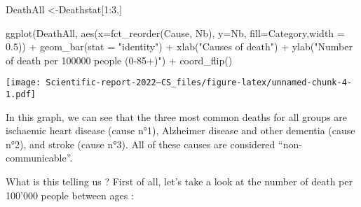 \documentclass[
]{article}
\newenvironment{Shaded}{\begin{snugshade}}{\end{snugshade}}
\newcommand{\AttributeTok}[1]{\textcolor[rgb]{0.77,0.63,0.00}{#1}}
\newcommand{\DecValTok}[1]{\textcolor[rgb]{0.00,0.00,0.81}{#1}}
\newcommand{\FloatTok}[1]{\textcolor[rgb]{0.00,0.00,0.81}{#1}}
\newcommand{\FunctionTok}[1]{\textcolor[rgb]{0.00,0.00,0.00}{#1}}
\newcommand{\NormalTok}[1]{#1}
\newcommand{\OtherTok}[1]{\textcolor[rgb]{0.56,0.35,0.01}{#1}}
\newcommand{\SpecialCharTok}[1]{\textcolor[rgb]{0.00,0.00,0.00}{#1}}
\newcommand{\StringTok}[1]{\textcolor[rgb]{0.31,0.60,0.02}{#1}}
\begin{document}
\begin{Shaded}
\begin{Highlighting}[]
\NormalTok{DeathAll }\OtherTok{\textless{}{-}}\NormalTok{Deathstat[}\DecValTok{1}\SpecialCharTok{:}\DecValTok{3}\NormalTok{,]}

\FunctionTok{ggplot}\NormalTok{(DeathAll, }\FunctionTok{aes}\NormalTok{(}\AttributeTok{x=}\FunctionTok{fct\_reorder}\NormalTok{(Cause, Nb), }\AttributeTok{y=}\NormalTok{Nb, }\AttributeTok{fill=}\NormalTok{Category,}\AttributeTok{width =} \FloatTok{0.5}\NormalTok{)) }\SpecialCharTok{+}
  \FunctionTok{geom\_bar}\NormalTok{(}\AttributeTok{stat =} \StringTok{"identity"}\NormalTok{) }\SpecialCharTok{+}
  \FunctionTok{xlab}\NormalTok{(}\StringTok{"Causes of death"}\NormalTok{) }\SpecialCharTok{+} 
  \FunctionTok{ylab}\NormalTok{(}\StringTok{"Number of death per 100\textquotesingle{}000 people (0{-}85+)"}\NormalTok{) }\SpecialCharTok{+}
  \FunctionTok{coord\_flip}\NormalTok{()}
\end{Highlighting}
\end{Shaded}

\texttt{[image: Scientific-report-2022---CS\_files/figure-latex/unnamed-chunk-4-1.pdf]}

In this graph, we can see that the three most common deaths for all
groups are ischaemic heart disease (cause n°1), Alzheimer disease and
other dementia (cause n°2), and stroke (cause n°3). All of these causes
are considered ``non-communicable''.

What is this telling us ? First of all, let's take a look at the number
of death per 100'000 people between ages :
\end{document}
